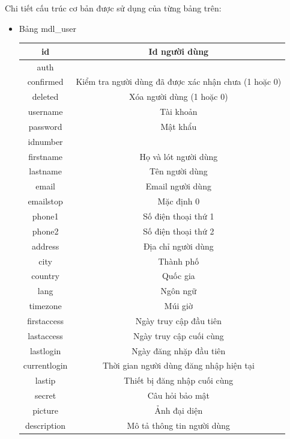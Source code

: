 \newpage
Chi tiết cấu trúc cơ bản được sử dụng của từng bảng trên:
\begin{itemize}
	\item Bảng mdl\_user
	\begin{center}
		\begin{table}[!htp]
			\centering
			\begin{tabular}{|c|c|}
				\hline 
				id & Id người dùng \\ 
				\hline 
				auth &  \\ 
				\hline 
				confirmed & Kiểm tra người dùng đã được xác nhận chưa (1 hoặc 0) \\ 
				\hline 
				deleted & Xóa người dùng (1 hoặc 0) \\ 
				\hline 
				username & Tài khoản \\ 
				\hline 
				password & Mật khẩu \\ 
				\hline 
				idnumber &  \\ 
				\hline 
				firstname & Họ và lót người dùng \\ 
				\hline 
				lastname & Tên người dùng \\ 
				\hline 
				email & Email người dùng \\ 
				\hline 
				emailstop & Mặc định 0 \\ 
				\hline 
				phone1 & Số điện thoại thứ 1 \\ 
				\hline 
				phone2 & Số điện thoại thứ 2 \\
				\hline 
				address & Địa chỉ người dùng \\ 
				\hline 
				city & Thành phố \\ 
				\hline 
				country & Quốc gia \\ 
				\hline 
				lang & Ngôn ngữ \\
				\hline 
				timezone & Múi giờ \\ 
				\hline 
				firstaccess & Ngày truy cập đầu tiên \\ 
				\hline 
				lastaccess & Ngày truy cập cuối cùng \\ 
				\hline 
				lastlogin & Ngày đăng nhặp đầu tiên \\ 
				\hline 
				currentlogin & Thời gian người dùng đăng nhập hiện tại \\ 
				\hline 
				lastip & Thiết bị đăng nhập cuối cùng \\ 
				\hline 
				secret & Câu hỏi bảo mật \\ 
				\hline 
				picture & Ảnh đại diện \\
				\hline 
				description & Mô tả thông tin người dùng \\ 

\end{tabular}
\end{table}
\end{center}
\end{itemize}
